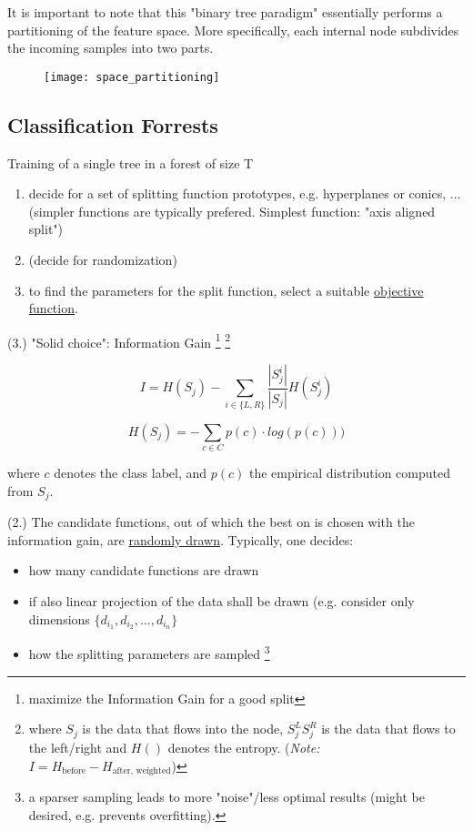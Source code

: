It is important to note that this "binary tree paradigm" essentially performs a partitioning of the feature space. More specifically, each internal node subdivides the incoming samples into two parts.

\begin{figure}[H]
  \centering
  \texttt{[image: space\_partitioning]}
\end{figure}

\newpage
\subsection*{Classification Forrests}
Training of a single tree in a forest of size T
\begin{enumerate}
    \item decide for a set of splitting function prototypes, e.g. hyperplanes or conics, ... (simpler functions are typically prefered. Simplest function: "axis aligned split")
    \item (decide for randomization)
    \item to find the parameters for the split function, select a suitable \underline{objective function}.
\end{enumerate}

(3.) "Solid choice": Information Gain \footnote{maximize the Information Gain for a good split} \footnote{where \(S_j\) is the data that flows into the node, \(S^L_j S^R_j\) is the data that flows to the left/right and \(H()\) denotes the entropy. (\textit{Note:} \(I = H_{\text{before}} - H_{\text{after, weighted}}\))}

\[I = H(S_j) - \sum_{i \in \{L,R\}} \frac{|S^i_j|}{|S_j|} H(S^i_j)\]

\[H(S_j) = -\sum_{c \in C} p(c) \cdot log(p(c)))\]

where \(c\) denotes the class label, and \(p(c)\) the empirical distribution computed from \(S_j\).


(2.) The candidate functions, out of which the best on is chosen with the information gain, are \underline{randomly drawn}. Typically, one decides:
\begin{itemize}
    \item how many candidate functions are drawn
    \item if also linear projection of the data shall be drawn (e.g. consider only dimensions \(\{d_{i_1}, d_{i_2}, \dots, d_{i_n}\}\)
    \item how the splitting parameters are sampled \footnote{a sparser sampling leads to more "noise"/less optimal results (might be desired, e.g. prevents overfitting).}
\end{itemize}

